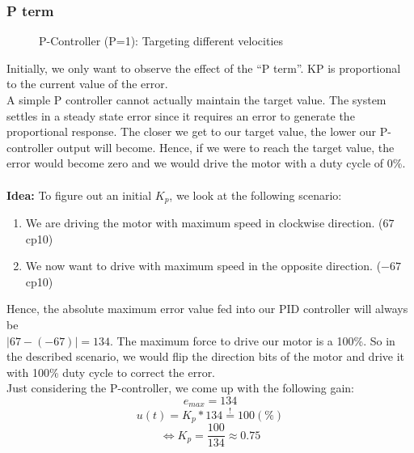 \subsubsection*{P term}
\begin{figure}
    \centering
{}
    \caption{P-Controller (P=1): Targeting different velocities} \label{fig:P1}
\end{figure}
Initially, we only want to observe the effect of the ``P term''.
KP is proportional to the current value of the error.
\\A simple P controller cannot actually maintain the target value. The system settles in a steady state error since it requires an error to generate the proportional response.
The closer we get to our target value, the lower our P-controller output will become. Hence, if we were to reach the target value, the error would become zero and we would drive the motor with a duty cycle of 0\%.
\\\\
\textbf{Idea:} To figure out an initial $K_p$, we look at the following scenario: \\
\begin{enumerate}
    \item We are driving the motor with maximum speed in clockwise direction. ($67$ cp10)
    \item We now want to drive with maximum speed in the opposite direction. ($-67$ cp10)
\end{enumerate}
Hence, the absolute maximum error value fed into our PID controller will always be
\\$| 67 - (-67)| = 134$. The maximum force to drive our motor is a 100\%.
So in the described scenario, we would flip the direction bits of the motor and drive it with 100\% duty cycle to correct the error.\\
Just considering the P-controller, we come up with the following gain:
$$e_{max} = 134$$
$$u(t) = K_p * 134 \stackrel{!}{=} 100 (\%)$$
$$\iff K_p = \frac{100}{134} \approx 0.75$$\\

